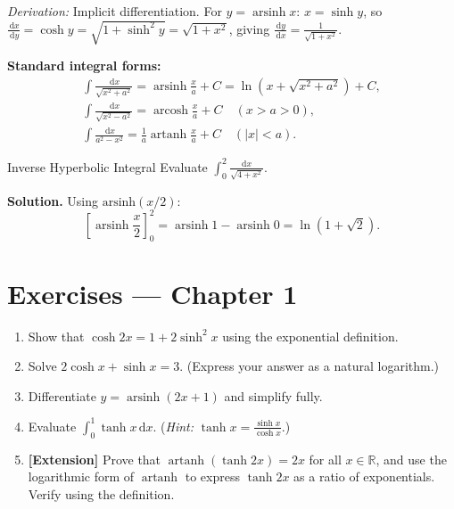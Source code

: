 \documentclass[12pt, a4paper]{book}
\newenvironment{keyresult}{%
  \begin{tcolorbox}[keystyle]%
}{%
  \end{tcolorbox}%
}
\newcommand{\arsinh}{\operatorname{arsinh}}
\newcommand{\arcosh}{\operatorname{arcosh}}
\newcommand{\artanh}{\operatorname{artanh}}
\newcommand{\R}{\mathbb{R}}
\newcommand{\dd}{\,\mathrm{d}}
\newcommand{\dx}{\,\mathrm{d}x}
\begin{document}
\textit{Derivation:} Implicit differentiation. For $\displaystyle y=\arsinh x$: $\displaystyle x=\sinh y$, so $\displaystyle \frac{\dx}{\dd y}=\cosh y=\sqrt{1+\sinh^2 y}=\sqrt{1+x^2}$, giving $\displaystyle \frac{\dd y}{\dx}=\frac{1}{\sqrt{1+x^2}}$.

\begin{keyresult}
\textbf{Standard integral forms:}
\[
\begin{aligned}
\int\frac{\dx}{\sqrt{x^2+a^2}} = \arsinh\frac{x}{a}+C = \ln\!\left(x+\sqrt{x^2+a^2}\right)+C, \\
\int\frac{\dx}{\sqrt{x^2-a^2}} = \arcosh\frac{x}{a}+C\quad(x>a>0), \\
\int\frac{\dx}{a^2-x^2} = \frac{1}{a}\artanh\frac{x}{a}+C\quad(|x|<a).
\end{aligned}
\]
\end{keyresult}

\begin{example}{Inverse Hyperbolic Integral}{}
Evaluate $\displaystyle \int_0^2 \frac{\mathrm{d}x}{\sqrt{4+x^2}}$.

\medskip

\textbf{Solution.} Using $\displaystyle \text{arsinh}(x/2)$:
\[
\left[\arsinh\frac{x}{2}\right]_0^2 = \arsinh 1 - \arsinh 0 = \ln(1+\sqrt{2}).
\]
\end{example}

\section*{Exercises — Chapter 1}
\begin{enumerate}[label=\textbf{\arabic*.}]
  \item Show that $\displaystyle \cosh 2x = 1 + 2\sinh^2 x$ using the exponential definition.
  \item Solve $\displaystyle 2\cosh x + \sinh x = 3$. (Express your answer as a natural logarithm.)
  \item Differentiate $\displaystyle y = \arsinh(2x+1)$ and simplify fully.
  \item Evaluate $\displaystyle\int_0^1\tanh x\dx$. (\textit{Hint:} $\tanh x = \frac{\sinh x}{\cosh x}$.)
  \item \textbf{[Extension]} Prove that $\artanh(\tanh 2x) = 2x$ for all $x\in\R$, and use the logarithmic form of $\artanh$ to express $\tanh 2x$ as a ratio of exponentials. Verify using the definition.
\end{enumerate}

\end{document}
